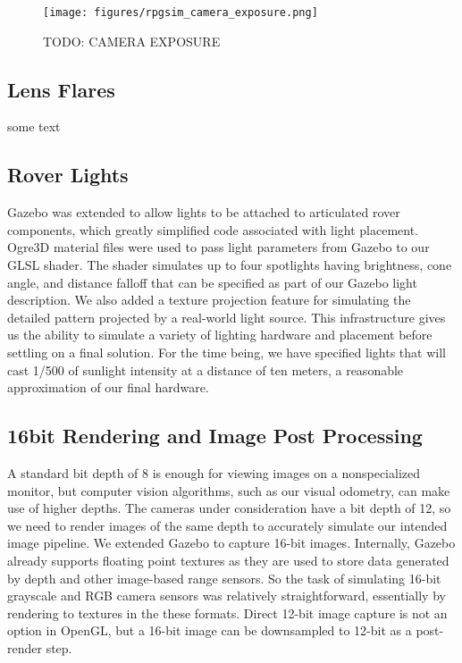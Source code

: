 \documentclass[twocolumn,letterpaper]{IEEEAerospaceCLS}  %
\begin{document}
\begin{figure}[h!]
	\texttt{[image: figures/rpgsim\_camera\_exposure.png]}
   	\caption{TODO: CAMERA EXPOSURE}
    \label{fig:cameraexposure}
\end{figure}

\subsection{Lens Flares}
some text

\subsection{Rover Lights}
Gazebo was extended to allow lights to be attached to articulated rover components, which greatly simplified code associated with light placement. Ogre3D material files were used to pass light parameters from Gazebo to our GLSL shader. The shader simulates up to four spotlights having brightness, cone angle, and distance falloff that can be specified as part of our Gazebo light description. We also added a texture projection feature for simulating the detailed pattern projected by a real-world light source. This infrastructure gives us the ability to simulate a variety of lighting hardware and placement before settling on a final solution. For the time being, we have specified lights that will cast 1/500 of sunlight intensity at a distance of ten meters, a reasonable approximation of our final hardware.

\subsection{16bit Rendering and Image Post Processing}
A standard bit depth of 8 is enough for viewing images on a nonspecialized monitor, but computer vision algorithms, such as our visual odometry, can make use of higher depths. The cameras under consideration have a bit depth of 12, so we need to render images of the same depth to accurately simulate our intended image pipeline. We extended Gazebo to capture 16-bit images. Internally, Gazebo already supports floating point textures as they are used to store data generated by depth and other image-based range sensors. So the task of simulating 16-bit grayscale and RGB camera sensors was relatively straightforward, essentially by rendering to textures in the these formats. Direct 12-bit image capture is not an option in OpenGL, but a 16-bit image can be downsampled to 12-bit as a post-render step.
\end{document}
